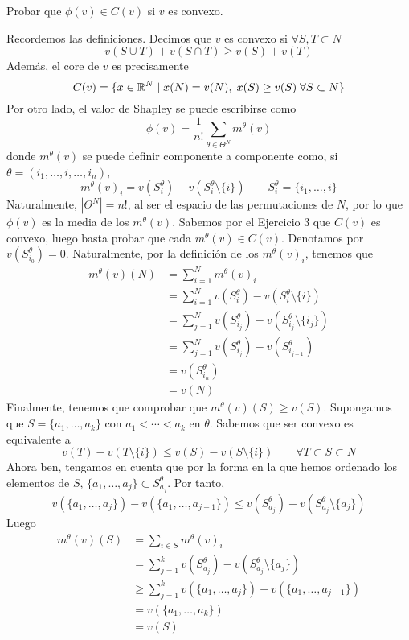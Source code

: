 \documentclass[twoside]{article}
\begin{document}
\newpage

\begin{ejercicio}{5}
Probar que $\phi(v)\in C(v)$ si $v$ es convexo.
\end{ejercicio}
\begin{solucion}
Recordemos las definiciones. Decimos que $v$ es convexo si $\forall S,T\subset N$
$$
v(S\cup T) + v(S\cap T) \geq v(S) + v(T) 
$$
Además, el core de $v$ es precisamente
$$
C(v) = \{x\in \mathbb{R}^{N}\mid x(N) = v(N), \; x(S) \geq v(S)\; \forall S \subset N\}
$$
Por otro lado, el valor de Shapley se puede escribirse como
$$
\phi(v) = \frac{1}{n!}\sum_{\theta \in \Theta^N}m^\theta(v)
$$
donde $m^{\theta}(v)$ se puede definir componente a componente como, si $\theta = (i_1,\dotsc,i,\dotsc,i_n)$,
$$
m^\theta(v)_i = v(S^\theta_i) - v(S^\theta_i\setminus\{i\}) \qquad S_i^\theta = \{i_1,\dotsc,i\} 
$$
Naturalmente, $|\Theta^N| = n!$, al ser el espacio de las permutaciones de $N$, por lo que $\phi(v)$ es la media de los $m^\theta(v)$. Sabemos por el Ejercicio 3 que $C(v)$ es convexo, luego basta probar que cada $m^\theta(v)\in C(v)$. Denotamos por $v(S_{i_0}^\theta) = 0$. Naturalmente, por la definición de los $m^\theta(v)_i$, tenemos que 
\begin{align*}
m^\theta(v)(N) &= \sum_{i=1}^N m^\theta(v)_i \\
&= \sum_{i=1}^N  v(S^\theta_i) - v(S^\theta_i\setminus\{i\}) \\
&= \sum_{j=1}^N  v(S^\theta_{i_j}) - v(S^\theta_{i_j}\setminus\{i_j\}) \\
&= \sum_{j=1}^N  v(S^\theta_{i_j}) - v(S^\theta_{i_{j-1}}) \\
&= v(S_{i_n}^\theta) \\
&= v(N) 
\end{align*}
\newpage
Finalmente, tenemos que comprobar que $m^\theta(v)(S) \geq v(S)$. Supongamos que $S=\{a_1,\dotsc,a_k\}$ con $a_1< \cdots < a_k$ en $\theta$. Sabemos que ser convexo es equivalente a
$$
v(T) - v(T\setminus\{i\}) \leq v(S) - v(S\setminus\{i\}) \qquad \forall T\subset S \subset N
$$
Ahora ben, tengamos en cuenta que por la forma en la que hemos ordenado los elementos de $S$, $\{a_1,\dotsc,a_j\}\subset S_{a_j}^\theta$. Por tanto,
$$
v(\{a_1,\dotsc,a_j\}) - v(\{a_1,\dotsc,a_{j-1}\}) \leq v(S_{a_j}^\theta) - v(S_{a_j}^\theta\setminus\{a_j\})
$$
Luego
\begin{align*}
m^\theta(v)(S) &= \sum_{i\in S}m^\theta(v)_i \\
&= \sum_{j=1}^k   v(S^\theta_{a_j}) - v(S^\theta_{a_j}\setminus\{a_j\}) \\
&\geq  \sum_{j=1}^k   v(\{a_1,\dotsc,a_j\}) - v(\{a_1,\dotsc,a_{j-1}\})\\
&= v(\{a_1,\dotsc,a_k\})\\
& = v(S)
\end{align*}

\end{solucion}
\end{document}
